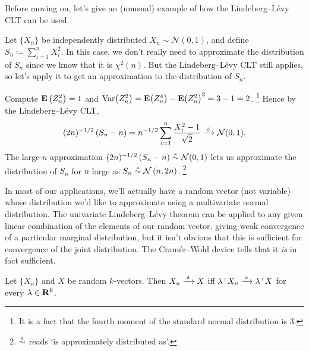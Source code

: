 \documentclass[11pt,letterpaper,reqno,oneside]{article}
\begin{document}
Before moving on, let's give an (unusual) example of how the Lindeberg--Lévy CLT can be used.
%
\begin{example}
	Let $\{ X_n \}$ be independently distributed $X_n \sim \mathcal{N}(0,1)$, and define $S_n \coloneqq \sum_{i=1}^n X_i^2$. In this case, we don't really need to approximate the distribution of $S_n$ since we know that it is $\chi^2(n)$. But the Lindeberg--Lévy CLT still applies, so let's apply it to get an approximation to the distribution of $S_n$.

	Compute $\mathbf{E}\left(Z_n^2\right) = 1$ and $\mathrm{Var}\bigl(Z_n^2\bigr) = \mathbf{E}\bigl(Z_n^4\bigr) - \mathbf{E}\bigl(Z_n^2\bigr)^2 = 3-1 = 2$.%
		\footnote{It is a fact that the fourth moment of the standard normal distribution is 3.}
	Hence by the Lindeberg--Lévy CLT,
	\begin{equation*}
		(2n)^{-1/2} \left( S_n - n \right)
		= n^{-1/2} \sum_{i=1}^n \frac{ X_i^2 - 1 }{ \sqrt{2} }
		\xrightarrow{{\scriptscriptstyle \mathrm{\;d\;}}} \mathcal{N}(0,1) .
	\end{equation*}
	The large-$n$ approximation $(2n)^{-1/2} \left( S_n - n \right) \protect\overset{{\scriptscriptstyle \mathrm{a}}}{\sim} \mathcal{N}(0,1)$ lets us approximate the distribution of $S_n$ for $n$ large as $S_n \protect\overset{{\scriptscriptstyle \mathrm{a}}}{\sim} \mathcal{N}\left( n, 2n \right)$.%
		\footnote{$\protect\overset{{\scriptscriptstyle \mathrm{a}}}{\sim}$ reads `is approximately distributed as'.}
\end{example}


In most of our applications, we'll actually have a random vector (not variable) whose distribution we'd like to approximate using a multivariate normal distribution. The univariate Lindeberg--Lévy theorem can be applied to any given linear combination of the elements of our random vector, giving weak convergence of a particular marginal distribution, but it isn't obvious that this is sufficient for convergence of the joint distribution. The Cramér--Wold device tells that it \emph{is} in fact sufficient.

\begin{theorem}
	Let $\{ X_n \}$ and $X$ be random $k$-vectors. Then $X_n \xrightarrow{{\scriptscriptstyle \mathrm{\;d\;}}} X$ iff $\lambda^{\scriptscriptstyle \top} X_n \xrightarrow{{\scriptscriptstyle \mathrm{\;d\;}}} \lambda^{\scriptscriptstyle \top} X$ for every $\lambda \in \mathbf{R}^k$.
\end{theorem}
\end{document}
